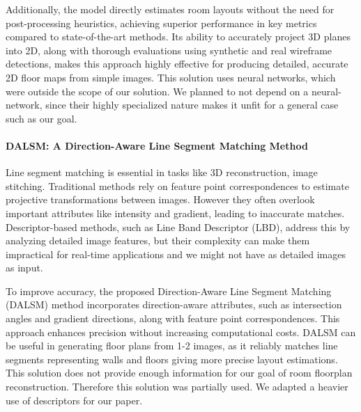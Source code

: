 Additionally, the model directly estimates room layouts without the need for post-processing heuristics, achieving superior performance in key metrics compared to state-of-the-art methods. 
Its ability to accurately project 3D planes into 2D, along with thorough evaluations using synthetic and real wireframe detections, makes this approach highly effective for producing detailed, accurate 2D floor maps from simple images. This solution uses neural networks, which were outside the scope of our solution. We planned to not depend on a neural-network, since their highly specialized nature makes it unfit for a general case such as our goal.

\paragraph{DALSM: A Direction-Aware Line Segment Matching Method}
Line segment matching is essential in tasks like 3D reconstruction, image stitching. Traditional methods rely on feature point correspondences to estimate projective transformations between images. 
However they often overlook important attributes like intensity and gradient, leading to inaccurate matches. 
Descriptor-based methods, such as Line Band Descriptor (LBD), address this by analyzing detailed image features, but their complexity can make them impractical for real-time applications and we might not have as detailed images as input.

To improve accuracy, the proposed Direction-Aware Line Segment Matching (DALSM) method incorporates direction-aware attributes, such as intersection angles and gradient directions, along with feature point correspondences. 
This approach enhances precision without increasing computational costs. 
DALSM can be useful in generating floor plans from 1-2 images, as it reliably matches line segments representing walls and floors giving more precise layout estimations. This solution does not provide enough information for our goal of room floorplan reconstruction. Therefore this solution was partially used. We adapted a heavier use of descriptors for our paper.

























